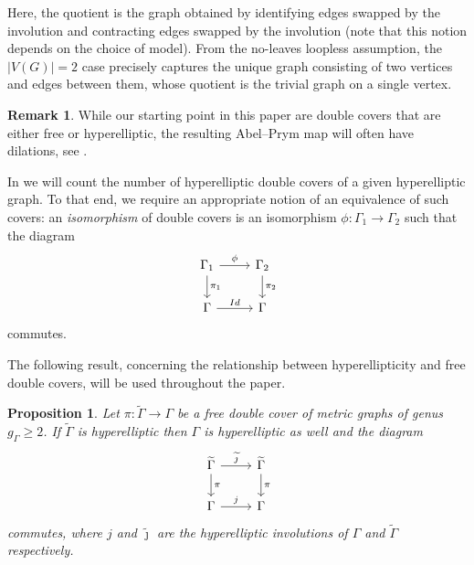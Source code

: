\documentclass[11pt]{article}
\newtheorem{prop}[theo]{Proposition}
\theoremstyle{definition}
\newtheorem{rema}[theo]{Remark}
\numberwithin{equation}{section}
\theoremstyle{definition}
\newcommand{\tGa}{\widetilde{\Gamma}}
\newcommand{\Ga}{\Gamma}
\newcommand{\tj}{\widetilde{\jmath}}
\newcommand{\wt}[1]{\widetilde{#1}}
\begin{document}
Here, the quotient is the graph obtained by identifying edges swapped by the involution and contracting edges swapped by the involution (note that this notion depends on the choice of model). From the no-leaves loopless assumption, the \mbox{$|V(G)|=2$} case precisely captures the unique graph consisting of two vertices and edges between them, whose quotient is the trivial graph on a single vertex. 

\begin{rema}
    While our starting point in this paper are  double covers that are either free or hyperelliptic, the resulting Abel--Prym map will often have dilations, see .
\end{rema}


In  we will count the number of hyperelliptic double covers of a given hyperelliptic graph. To that end, we require  an appropriate notion of an equivalence of such covers:
an \emph{isomorphism}  of double covers is an isomorphism $\phi\colon\Gamma_1\to \Gamma_2$ such that the diagram
\[
\begin{tikzcd}
\Gamma_1 \arrow[r, "\phi"] \arrow[d, "\pi_1"] & \Gamma_2 \arrow[d, "\pi_2"] \\
\Gamma \arrow[r, "Id"]                        & \Gamma                     
\end{tikzcd}
\]
commutes.

The following result, concerning  the relationship between  hyperellipticity and free double covers,  will be used throughout the paper. 

\begin{prop}\label{commutative}
    Let $\pi\colon \tGa\to \Gamma$ be a free double cover of  metric graphs of genus $g_\Gamma\geq 2$. If $\wt\Gamma$ is hyperelliptic 
     then 
$\Gamma$ is hyperelliptic as well and the diagram
         \[
        \begin{tikzcd}
\tGa \arrow[d, "\pi"] \arrow[r, "\tj"] & \tGa\arrow[d, "\pi"] \\
\Ga\arrow[r, "j"]                        & \Ga                        
\end{tikzcd}
        \]
         commutes, where $j$ and $\tj$ are the hyperelliptic involutions of $\Gamma$  and $\wt\Gamma$ respectively.  
   \end{prop}
   
\end{document}
